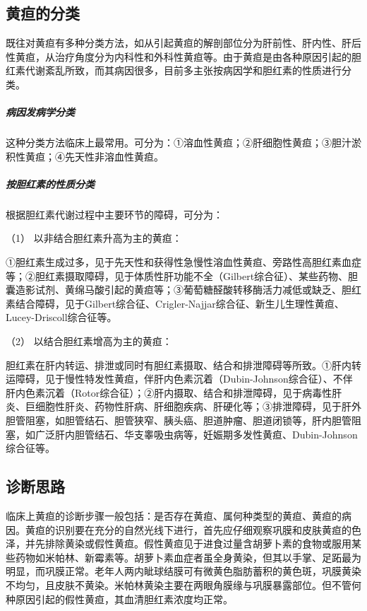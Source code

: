 \subsection{黄疸的分类}

既往对黄疸有多种分类方法，如从引起黄疸的解剖部位分为肝前性、肝内性、肝后性黄疸，从治疗角度分为内科性和外科性黄疸等。由于黄疸是由各种原因引起的胆红素代谢紊乱所致，而其病因很多，目前多主张按病因学和胆红素的性质进行分类。

\subparagraph{病因发病学分类}

这种分类方法临床上最常用。可分为：①溶血性黄疸；②肝细胞性黄疸；③胆汁淤积性黄疸；④先天性非溶血性黄疸。

\subparagraph{按胆红素的性质分类}

根据胆红素代谢过程中主要环节的障碍，可分为：

\hypertarget{text00039.htmlux5cux23CHP1-16-2-2-1}{}
（1） 以非结合胆红素升高为主的黄疸：

①胆红素生成过多，见于先天性和获得性急慢性溶血性黄疸、旁路性高胆红素血症等；②胆红素摄取障碍，见于体质性肝功能不全（Gilbert综合征）、某些药物、胆囊造影试剂、黄绵马酸引起的黄疸等；③葡萄糖醛酸转移酶活力减低或缺乏、胆红素结合障碍，见于Gilbert综合征、Crigler-Najjar综合征、新生儿生理性黄疸、Lucey-Driscoll综合征等。

\hypertarget{text00039.htmlux5cux23CHP1-16-2-2-2}{}
（2） 以结合胆红素增高为主的黄疸：

胆红素在肝内转运、排泄或同时有胆红素摄取、结合和排泄障碍等所致。①肝内转运障碍，见于慢性特发性黄疸，伴肝内色素沉着（Dubin-Johnson综合征）、不伴肝内色素沉着（Rotor综合征）；②肝内摄取、结合和排泄障碍，见于病毒性肝炎、巨细胞性肝炎、药物性肝病、肝细胞疾病、肝硬化等；③排泄障碍，见于肝外胆管阻塞，如胆管结石、胆管狭窄、胰头癌、胆道肿瘤、胆道闭锁等，肝内胆管阻塞，如广泛肝内胆管结石、华支睾吸虫病等，妊娠期多发性黄疸、Dubin-Johnson综合征等。

\subsection{诊断思路}

临床上黄疸的诊断步骤一般包括：是否存在黄疸、属何种类型的黄疸、黄疸的病因。黄疸的识别要在充分的自然光线下进行，首先应仔细观察巩膜和皮肤黄疸的色泽，并先排除黄染或假性黄疸。假性黄疸见于进食过量含胡萝卜素的食物或服用某些药物如米帕林、新霉素等。胡萝卜素血症者虽全身黄染，但其以手掌、足跖最为明显，而巩膜正常。老年人两内眦球结膜可有微黄色脂肪蓄积的黄色斑，巩膜黄染不均匀，且皮肤不黄染。米帕林黄染主要在两眼角膜缘与巩膜暴露部位。但不管何种原因引起的假性黄疸，其血清胆红素浓度均正常。

